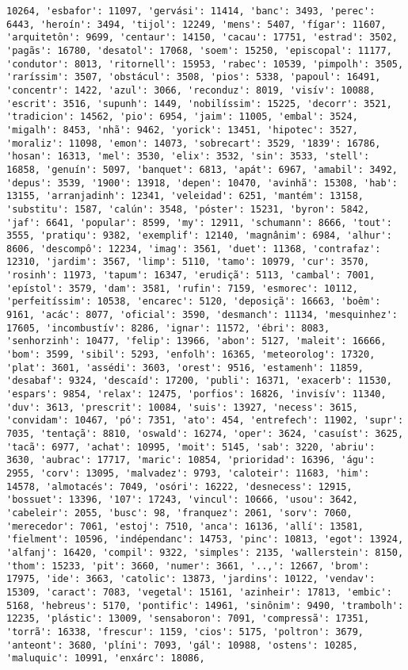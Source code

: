 \begin{Verbatim}[commandchars=\\\{\}]
10264, 'esbafor': 11097, 'gervási': 11414, 'banc': 3493, 'perec': 6443, 'heroín': 3494, 'tijol': 12249, 'mens': 5407, 'fígar': 11607, 'arquitetôn': 9699, 'centaur': 14150, 'cacau': 17751, 'estrad': 3502, 'pagãs': 16780, 'desatol': 17068, 'soem': 15250, 'episcopal': 11177, 'condutor': 8013, 'ritornell': 15953, 'rabec': 10539, 'pimpolh': 3505, 'raríssim': 3507, 'obstácul': 3508, 'pios': 5338, 'papoul': 16491, 'concentr': 1422, 'azul': 3066, 'reconduz': 8019, 'visív': 10088, 'escrit': 3516, 'supunh': 1449, 'nobilíssim': 15225, 'decorr': 3521, 'tradicion': 14562, 'pio': 6954, 'jaim': 11005, 'embal': 3524, 'migalh': 8453, 'nhã': 9462, 'yorick': 13451, 'hipotec': 3527, 'moraliz': 11098, 'emon': 14073, 'sobrecart': 3529, '1839': 16786, 'hosan': 16313, 'mel': 3530, 'elix': 3532, 'sin': 3533, 'stell': 16858, 'genuín': 5097, 'banquet': 6813, 'apát': 6967, 'amabil': 3492, 'depus': 3539, '1900': 13918, 'depen': 10470, 'avinhã': 15308, 'hab': 13155, 'arranjadinh': 12341, 'veleidad': 6251, 'mantém': 13158, 'substitu': 1587, 'calún': 3548, 'póster': 15231, 'byron': 5842, 'jaf': 6641, 'popular': 8599, 'my': 12911, 'schumann': 8666, 'tout': 3555, 'pratiqu': 9382, 'exemplif': 12140, 'magnânim': 6984, 'alhur': 8606, 'descompô': 12234, 'imag': 3561, 'duet': 11368, 'contrafaz': 12310, 'jardim': 3567, 'limp': 5110, 'tamo': 10979, 'cur': 3570, 'rosinh': 11973, 'tapum': 16347, 'erudiçã': 5113, 'cambal': 7001, 'epístol': 3579, 'dam': 3581, 'rufin': 7159, 'esmorec': 10112, 'perfeitíssim': 10538, 'encarec': 5120, 'deposiçã': 16663, 'boêm': 9161, 'acác': 8077, 'oficial': 3590, 'desmanch': 11134, 'mesquinhez': 17605, 'incombustív': 8286, 'ignar': 11572, 'ébri': 8083, 'senhorzinh': 10477, 'felip': 13966, 'abon': 5127, 'maleit': 16666, 'bom': 3599, 'sibil': 5293, 'enfolh': 16365, 'meteorolog': 17320, 'plat': 3601, 'assédi': 3603, 'orest': 9516, 'estamenh': 11859, 'desabaf': 9324, 'descaíd': 17200, 'publi': 16371, 'exacerb': 11530, 'espars': 9854, 'relax': 12475, 'porfios': 16826, 'invisív': 11340, 'duv': 3613, 'prescrit': 10084, 'suis': 13927, 'necess': 3615, 'convidam': 10467, 'pó': 7351, 'ato': 454, 'entrefech': 11902, 'supr': 7035, 'tentaçã': 8810, 'oswald': 16274, 'oper': 3624, 'casuíst': 3625, 'tacã': 6977, 'achat': 10995, 'moit': 5145, 'sab': 3220, 'abriu': 3630, 'aubrac': 17717, 'maric': 10854, 'prioridad': 16396, 'águ': 2955, 'corv': 13095, 'malvadez': 9793, 'caloteir': 11683, 'him': 14578, 'almotacés': 7049, 'osóri': 16222, 'desnecess': 12915, 'bossuet': 13396, '107': 17243, 'vincul': 10666, 'usou': 3642, 'cabeleir': 2055, 'busc': 98, 'franquez': 2061, 'sorv': 7060, 'merecedor': 7061, 'estoj': 7510, 'anca': 16136, 'allí': 13581, 'fielment': 10596, 'indépendanc': 14753, 'pinc': 10813, 'egot': 13924, 'alfanj': 16420, 'compil': 9322, 'simples': 2135, 'wallerstein': 8150, 'thom': 15233, 'pit': 3660, 'numer': 3661, '..,': 12667, 'brom': 17975, 'ide': 3663, 'catolic': 13873, 'jardins': 10122, 'vendav': 15309, 'caract': 7083, 'vegetal': 15161, 'azinheir': 17813, 'embic': 5168, 'hebreus': 5170, 'pontific': 14961, 'sinônim': 9490, 'trambolh': 12235, 'plástic': 13009, 'sensaboron': 7091, 'compressã': 17351, 'torrã': 16338, 'frescur': 1159, 'cios': 5175, 'poltron': 3679, 'anteont': 3680, 'plíni': 7093, 'gál': 10988, 'ostens': 10285, 'maluquic': 10991, 'enxárc': 18086, 
\end{Verbatim}
